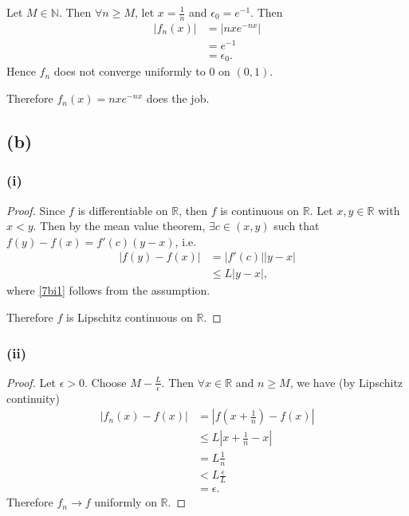 \documentclass{article}
\newcommand{\R}{\mathbb{R}} %
\newcommand{\N}{\mathbb{N}} %
\begin{document}
Let $M \in \N$. Then $\forall n \geq M$, let $x = \frac{1}{n}$ and $\epsilon_0 = e^{-1}$. Then
\begin{align}
	|f_n(x)| &= \left|nxe^{-nx}\right| \\
	&= e^{-1} \\
	&= \epsilon_0.
\end{align}
Hence $f_n$ does not converge uniformly to $0$ on $(0, 1)$.

Therefore $f_n(x) = nxe^{-nx}$ does the job.

\subsection*{(b)}
\subsubsection*{(i)}
\begin{proof}
	Since $f$ is differentiable on $\R$, then $f$ is continuous on $\R$. Let $x, y \in \R$ with $x < y$. Then by the mean value theorem, $\exists c \in (x, y)$ such that \\$f(y) - f(x) = f'(c)(y - x)$, i.e. 
	\begin{align}
		|f(y) - f(x)| & = |f'(c)||y - x| \\
		& \leq L |y - x|, \label{7bi1}
	\end{align}
	where \eqref{7bi1} follows from the assumption. 
	
	Therefore $f$ is Lipschitz continuous on $\R$.
\end{proof}

\subsubsection*{(ii)}
\begin{proof}
	Let $\epsilon > 0$. Choose $M - \frac{L}{\epsilon}$. Then $\forall x \in \R$ and $n \geq M$, we have (by Lipschitz continuity)
	\begin{align}
		|f_n(x) - f(x)| &= |f(x + \frac{1}{n}) - f(x)| \\
		&\leq L |x + \frac{1}{n} - x| \\
		&= L \frac{1}{n} \\
		&< L \frac{\epsilon}{L} \\
		&= \epsilon.
	\end{align}
	Therefore $f_n \to f$ uniformly on $\R$.
\end{proof}
\end{document}

